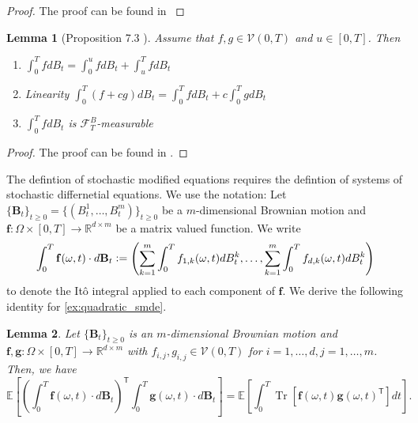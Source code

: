 \documentclass[12pt]{article}
\newtheorem{lemma}[lemma]{Lemma}
\theoremstyle{definition}
\numberwithin{equation}{section}
\newcommand{\R}{\mathbb{R}}
\newcommand{\CF}{\mathcal{F}}
\newcommand{\CV}{\mathcal{V}}
\newcommand{\T}{\mathsf{T}}
\newcommand{\ev}[1]{\mathbb{E}\left[{#1}\right]}
\newcommand{\defeq}{\vcentcolon=}
\DeclareMathOperator{\Tr}{Tr}
\begin{document}
\begin{proof}
  The proof can be found in \cite[pp.~208]{capassoIntroductionContinuousTimeStochastic2012}
\end{proof}
\begin{lemma}[Proposition 7.3 ]
  Assume that $f,g \in \CV(0,T)$ and $u \in [0,T]$. Then
  \begin{enumerate}[label=(\roman*)]
    \item $\displaystyle\int_0^TfdB_t = \int_0^ufdB_t + \int_u^TfdB_t$
    \item Linearity $\displaystyle\int_0^T(f+cg)dB_t =  \int_0^TfdB_t + c \int_0^TgdB_t$
    \item $\displaystyle\int_0^TfdB_t$ is $\CF_T^B$-measurable
  \end{enumerate}
\end{lemma}
\begin{proof}
  The proof can be found in \cite{eAppliedStochasticAnalysis2021}.
\end{proof}
The defintion of stochastic modified equations requires the defintion of systems of stochastic differnetial equations. We use the notation: Let $\{\mathbf{B}_t\}_{t\geq 0} = \{(B^1_t, \dots, B^m_t)\}_{t\geq 0}$ be a $m$-dimensional Brownian motion and $\mathbf{f}: \Omega \times [0,T] \rightarrow \R^{d \times m}$ be a matrix valued function. We write 
\begin{equation*}
  \int_0^T \mathbf{f}(\omega, t)\cdot d\mathbf{B}_t \defeq \left(\sum_{k=1}^m\int_0^T f_{1,k}(\omega, t)dB_t^k, \dots, \sum_{k=1}^m\int_0^T f_{d,k}(\omega, t)dB_t^k \right)
\end{equation*}
to denote the Itô integral applied to each component of $\mathbf{f}$.
We derive the following identity for \autoref{ex:quadratic_smde}.
\begin{lemma}
  \label{lem:ito}
  Let $\{\pmb{B}_t\}_{t\geq0}$ is an $m$-dimensional Brownian motion and $\mathbf{f}, \mathbf{g}: \Omega \times [0,T] \rightarrow \R^{d \times m}$ with $f_{i,j}, g_{i,j}  \in \CV(0,T)$ for $i=1,\dots,d, j=1,\dots,m$. Then, we have
  \begin{equation}
  \label{eq:multivariate_ito_isometry}
    \ev{\left(\int_0^T \pmb{f}(\omega, t)\cdot d\pmb{B}_t\right)^\mathsf{T}\int_0^T \pmb{g}(\omega, t)\cdot d\pmb{B}_t} = \ev{\int_0^T \Tr\left[\pmb{f}(\omega, t)\pmb{g}(\omega, t)^\T\right]dt}.
  \end{equation}

\end{lemma}
\end{document}
